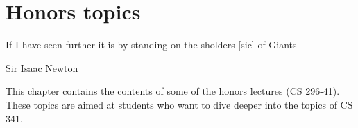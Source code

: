 \chapter{Honors topics}

\epigraph{If I have seen further it is by standing on the sholders [sic] of Giants}{Sir Isaac Newton}

This chapter contains the contents of some of the honors lectures (CS 296-41). These topics are aimed at students who
want to dive deeper into the topics of CS 341.






